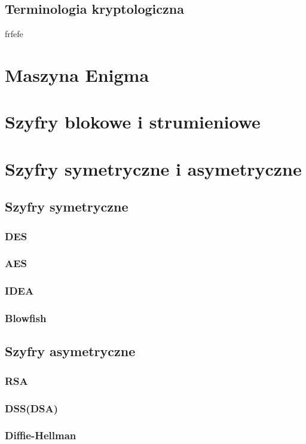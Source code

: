 \documentclass[12p]{report}
\begin{document}
\subsection{Terminologia kryptologiczna}
frfefe

\section{Maszyna Enigma}

\section{Szyfry blokowe i strumieniowe}
\section{Szyfry symetryczne i asymetryczne}
\subsection{Szyfry symetryczne}
\subsubsection{DES}
\subsubsection{AES}
\subsubsection{IDEA}
\subsubsection{Blowfish}
\subsection{Szyfry asymetryczne}
\subsubsection{RSA}
\subsubsection{DSS(DSA)}
\subsubsection{Diffie-Hellman}
\end{document}

